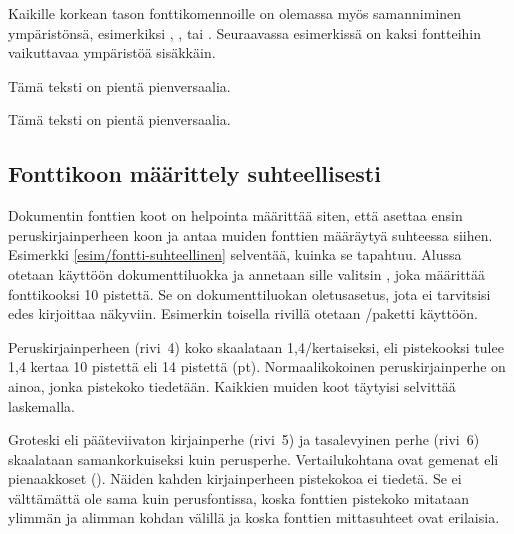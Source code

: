Kaikille korkean tason fonttikomennoille on olemassa myös samanniminen
ympäristönsä, esimerkiksi , ,
 tai . Seuraavassa esimerkissä on
kaksi fontteihin vaikuttavaa ympäristöä sisäkkäin.

\begin{koodilohkosis}
\begin{footnotesize}
  \begin{scshape}
    Tämä teksti on pientä pienversaalia.
  \end{scshape}
\end{footnotesize}
\end{koodilohkosis}

\begin{tulossis}
  \begin{footnotesize}
    \begin{scshape}
      Tämä teksti on pientä pienversaalia.
    \end{scshape}
  \end{footnotesize}
\end{tulossis}

\subsection{Fonttikoon määrittely suhteellisesti}
\label{luku/fontti-suhteellinen}

Dokumentin fonttien koot on helpointa määrittää siten, että asettaa
ensin peruskirjainperheen koon ja antaa muiden fonttien määräytyä
suhteessa siihen. Esimerkki \ref{esim/fontti-suhteellinen} selventää,
kuinka se tapahtuu. Alussa otetaan käyttöön dokumenttiluokka
 ja annetaan sille valitsin \koodi{10pt}, joka määrittää
fonttikooksi 10 pistettä. Se on dokumenttiluokan oletusasetus, jota ei
tarvitsisi edes kirjoittaa näkyviin. Esimerkin toisella rivillä otetaan
\-/paketti käyttöön.

Peruskirjainperheen (rivi~4) koko skaalataan 1,4\-/kertaiseksi, eli
pistekooksi tulee 1,4 kertaa 10 pistettä eli 14 pistettä (pt).
Normaalikokoinen peruskirjainperhe on ainoa, jonka pistekoko tiedetään.
Kaikkien muiden koot täytyisi selvittää laskemalla.

Groteski eli pääteviivaton kirjainperhe (rivi~5) ja tasalevyinen perhe
(rivi~6) skaalataan samankorkuiseksi kuin perusperhe. Vertailukohtana
ovat gemenat eli pienaakkoset (). Näiden kahden
kirjainperheen pistekokoa ei tiedetä. Se ei välttämättä ole sama kuin
perusfontissa, koska fonttien pistekoko mitataan ylimmän ja alimman
kohdan välillä ja koska fonttien mittasuhteet ovat erilaisia.

